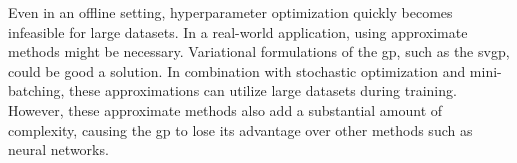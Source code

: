 Even in an offline setting, hyperparameter optimization quickly becomes infeasible for large datasets. In a real-world application, using approximate methods might be necessary. Variational formulations of the \acrshort{gp}, such as the \acrshort{svgp}, could be good a solution. In combination with stochastic optimization and mini-batching, these approximations can utilize large datasets during training. However, these approximate methods also add a substantial amount of complexity, causing the \acrshort{gp} to lose its advantage over other methods such as neural networks.




